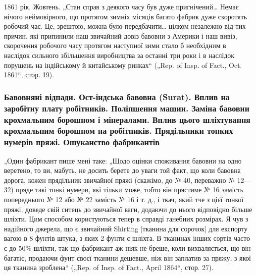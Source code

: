 
1861 рік. Жовтень. „Стан справ з деякого часу був дуже
пригнічений\dots{} Немає нічого неймовірного, що протягом зимніх
місяців багато фабрик дуже скоротять робочий час. Це, зрештою,
можна було передбачити\dots{} цілком незалежно від тих причин,
які припинили наш звичайний довіз бавовни з Америки і наш вивіз,
скорочення робочого часу протягом наступної зими стало б
необхідним в наслідок сильного збільшення виробництва за
останні три роки і в наслідок порушень на індійському й китайському
ринках“ („Rep. of Insp. of Fact., Oct. 1861“, стор. 19).

\subsubsection{Бавовняні відпади. Ост-індська бавовна (Surat). Вплив на заробітну плату
робітників. Поліпшення машин. Заміна бавовни крохмальним борошном і
мінералами. Вплив цього шліхтування крохмальним борошном на робітників.
Прядільники тонких нумерів пряжі. Ошуканство фабрикантів}

„Один фабрикант пише мені таке: „Щодо оцінки споживання
бавовни на одно веретено, то ви, мабуть, не досить берете до
уваги той факт, що коли бавовна дорога, кожен прядільник
звичайної пряжі (скажімо, до № 40, переважно № 12—32) пряде
такі тонкі нумери, які тільки може, тобто він прястиме № 16
замість попереднього № 12 або № 22 замість № 16 і т. д.,
і ткач, який тче з цієї тонкої пряжі, доведе свій ситець до
звичайної ваги, додаючи до нього відповідно більше шліхти.
Цим способом користуються тепер в справді ганебних розмірах.
Я чув з надійного джерела, що є звичайний Shirting [тканина
для сорочок] для експорту вагою в 8 фунтів штука, з яких
2 фунти є шліхта. В тканинах інших сортів часто є до 50\%
шліхти, так що фабрикант аж ніяк не бреше, коли вихваляється,
що він багатіє, продаючи фунт своєї тканини дешевше, ніж він
заплатив за пряжу, з якої ця тканина зроблена“ („Rep. of Insp.
of Fact., April 1864“, стор. 27).


